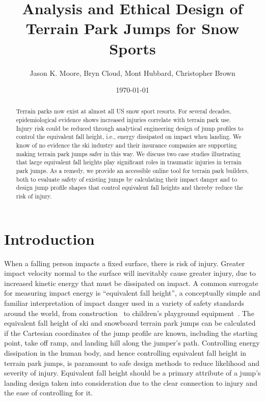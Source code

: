 \documentclass{article}
\title{Analysis and Ethical Design of Terrain Park Jumps for Snow Sports}
\author{Jason K. Moore, Bryn Cloud, Mont Hubbard, Christopher Brown}
\date{\today}
\begin{document}
\maketitle

\begin{abstract}
  Terrain parks now exist at almost all US snow sport resorts. For several
  decades, epidemiological evidence shows increased injuries correlate with
  terrain park use. Injury risk could be reduced through analytical engineering
  design of jump profiles to control the equivalent fall height, i.e., energy
  dissipated on impact when landing. We know of no evidence the ski industry and their insurance
  companies are supporting making terrain park jumps safer in this way. We discuss two case
  studies illustrating that large equivalent fall heights play significant
  roles in traumatic injuries in terrain park jumps. As a remedy, we provide an
  accessible online tool for terrain park builders, both to evaluate safety of
  existing jumps by calculating their impact danger and to design jump profile
  shapes that control equivalent fall heights and thereby reduce the risk of
  injury.
\end{abstract}

\section{Introduction}
%
When a falling person impacts a fixed surface, there is risk of injury. Greater
impact velocity normal to the surface will inevitably cause greater injury, due
to increased kinetic energy that must be dissipated on impact. A common
surrogate for measuring impact energy is ``equivalent fall height'', a
conceptually simple and familiar interpretation of impact danger used in a
variety of safety standards around the world, from construction~\cite{OSHA2021}
to children's playground equipment~\cite{Chalmers1996}. The equivalent fall
height of ski and snowboard terrain park jumps can be
calculated~\cite{McNeil2012} if the Cartesian coordinates of the jump profile
are known, including the starting point, take off ramp, and landing hill along
the jumper's path. Controlling energy dissipation in the human body, and hence
controlling equivalent fall height in terrain park jumps, is paramount to safe
design methods to reduce likelihood and severity of injury. Equivalent fall
height should be a primary attribute of a jump's landing design taken into
consideration due to the clear connection to injury and the ease of controlling
for it.
\end{document}
